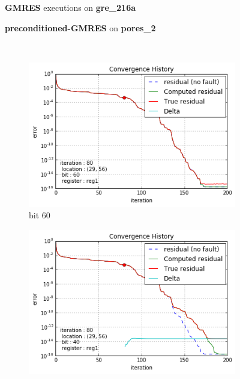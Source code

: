 \begin{figure}[h]
	\centering
    
\begin{minipage}[b]{0.45\linewidth}
\centering
\textbf{GMRES} executions on \textbf{gre_216a} 
\end{minipage}
\quad
\begin{minipage}{0.45\linewidth}
\centering
\textbf{preconditioned-GMRES} on \textbf{pores_2}
\end{minipage}\\


    \begin{minipage}[b]{0.48\linewidth}
	\begin{subfigure}[t]{\linewidth}
		\centering
		\includegraphics[width=\linewidth]{figures/gre_216a/convergence_history_bit_0.png}
		\caption{bit 60}\label{fig:gre_216a_conv_hist_bit_0}		
	\end{subfigure}
	\quad
	\begin{subfigure}[t]{\linewidth}
		\centering
		\includegraphics[width=\linewidth]{figures/gre_216a/convergence_history_bit_1.png}

\end{subfigure}
\end{minipage}
\end{figure}
